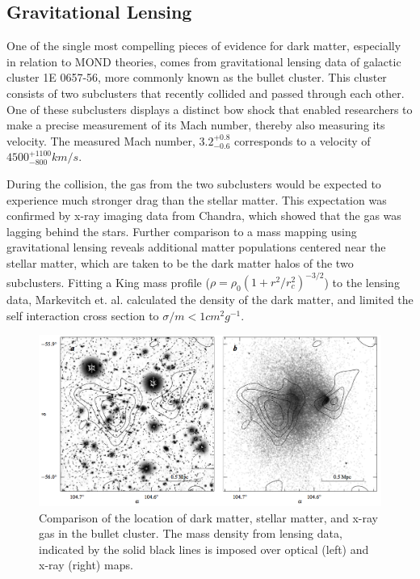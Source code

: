 \subsection{Gravitational Lensing}
One of the single most compelling pieces of evidence for dark matter, especially in relation to MOND theories, comes from gravitational lensing data of galactic cluster 1E 0657-56, more commonly known as the bullet cluster. This cluster consists of two subclusters that recently collided and passed through each other. One of these subclusters displays a distinct bow shock that enabled researchers to make a precise measurement of its Mach number, thereby also measuring its velocity. The measured Mach number, $3.2_{-0.6}^{+0.8}$ corresponds to a velocity of $4500_{-800}^{+1100}km/s$\cite{markevitch}. 

During the collision, the gas from the two subclusters would be expected to experience much stronger drag than the stellar matter. This expectation was confirmed by x-ray imaging data from Chandra, which showed that the gas was lagging behind the stars. Further comparison to a mass mapping using gravitational lensing reveals additional matter populations centered near the stellar matter, which are taken to be the dark matter halos of the two subclusters. Fitting a King mass profile ($\rho=\rho_{0}(1+r^{2}/r_{c}^{2})^{-3/2}$) to the lensing data, Markevitch et. al. calculated the density of the dark matter, and limited the self interaction cross section to $\sigma/m < 1 cm^{2} g^{-1}$\cite{markevitch}.

\begin{figure}[h!]
\centering
\includegraphics[width=150mm]{Figures/bullet}
\caption{Comparison of the location of dark matter, stellar matter, and x-ray gas in the bullet cluster. The mass density from lensing data, indicated by the solid black lines is imposed over optical (left) and x-ray (right) maps\cite{markevitch}.}
\end{figure}

